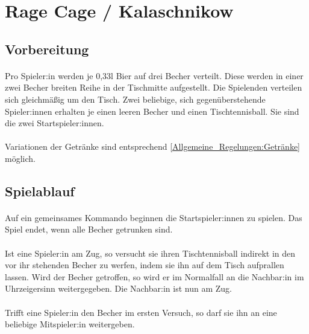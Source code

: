 \section{Rage Cage / Kalaschnikow}
\subsection{Vorbereitung}
\paragraph{}
Pro Spieler:in werden je 0,33l Bier auf drei Becher verteilt.
Diese werden in einer zwei Becher breiten Reihe in der Tischmitte aufgestellt.
Die Spielenden verteilen sich gleichmäßig um den Tisch.
Zwei beliebige, sich gegenüberstehende Spieler:innen erhalten je einen leeren Becher und einen Tischtennisball.
Sie sind die zwei Startspieler:innen.

\paragraph{}
Variationen der Getränke sind entsprechend \ref{Allgemeine_Regelungen:Getränke} möglich.

\subsection{Spielablauf}
\paragraph{}
Auf ein gemeinsames Kommando beginnen die Startspieler:innen zu spielen.
Das Spiel endet, wenn alle Becher getrunken sind.

\paragraph{}
Ist eine Spieler:in am Zug, so versucht sie ihren Tischtennisball indirekt in den vor ihr stehenden Becher zu werfen, indem sie ihn auf dem Tisch aufprallen lassen.
Wird der Becher getroffen, so wird er im Normalfall an die Nachbar:in im Uhrzeigersinn weitergegeben.
Die Nachbar:in ist nun am Zug.

\paragraph{}
Trifft eine Spieler:in den Becher im ersten Versuch, so darf sie ihn an eine beliebige Mitspieler:in weitergeben.

